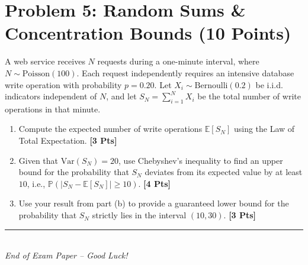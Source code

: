 \documentclass[11pt,a4paper]{article}
\begin{document}
\vspace{0.5cm}

\section*{Problem 5: Random Sums \& Concentration Bounds \hfill (10 Points)}
A web service receives $N$ requests during a one-minute interval, where $N \sim \text{Poisson}(100)$. Each request independently requires an intensive database write operation with probability $p = 0.20$. Let $X_i \sim \text{Bernoulli}(0.2)$ be i.i.d. indicators independent of $N$, and let $S_N = \sum_{i=1}^N X_i$ be the total number of write operations in that minute.
\begin{enumerate}[label=(\alph*), itemsep=4pt]
    \item Compute the expected number of write operations $\mathbb{E}[S_N]$ using the Law of Total Expectation. \hfill \textbf{[3 Pts]}
    \item Given that $\text{Var}(S_N) = 20$, use Chebyshev's inequality to find an upper bound for the probability that $S_N$ deviates from its expected value by at least $10$, i.e., $\mathbb{P}(|S_N - \mathbb{E}[S_N]| \ge 10)$. \hfill \textbf{[4 Pts]}
    \item Use your result from part (b) to provide a guaranteed lower bound for the probability that $S_N$ strictly lies in the interval $(10, 30)$. \hfill \textbf{[3 Pts]}
\end{enumerate}

\vspace{1cm}
\begin{center}
    \rule{0.4\textwidth}{0.5pt}\\
    {\small \textit{End of Exam Paper -- Good Luck!}}
\end{center}
\end{document}
